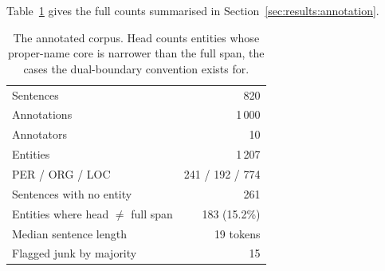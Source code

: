Table~\ref{tab:corpus-stats} gives the full counts summarised in Section~\ref{sec:results:annotation}.

\begin{table}[htbp]
\centering
\caption{The annotated corpus. Head counts entities whose proper-name core is narrower
than the full span, the cases the dual-boundary convention exists for.}
\label{tab:corpus-stats}
\begin{tabular}{lr}
\toprule
Sentences & 820 \\
Annotations & 1\,000 \\
Annotators & 10 \\
Entities & 1\,207 \\
\quad PER / ORG / LOC & 241 / 192 / 774 \\
Sentences with no entity & 261 \\
Entities where head $\neq$ full span & 183 (15.2\%) \\
Median sentence length & 19 tokens \\
Flagged junk by majority & 15 \\
\bottomrule
\end{tabular}
\end{table}

\FloatBarrier

